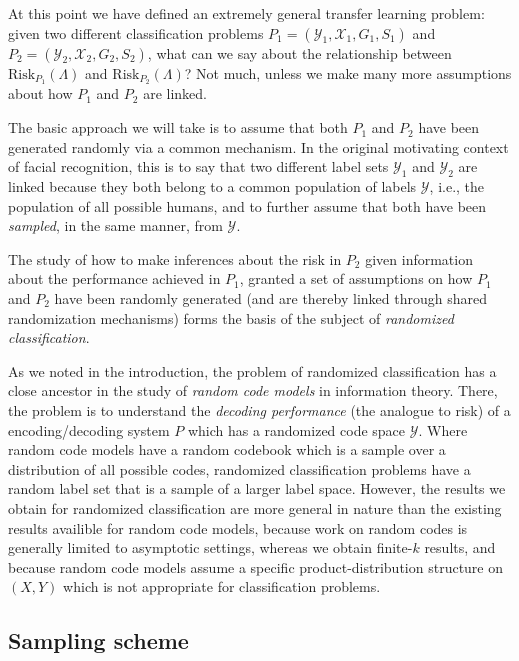 At this point we have defined an extremely general transfer learning
problem: given two different classification problems $P_1 =
(\mathcal{Y}_1, \mathcal{X}_1, G_1, S_1)$ and $P_2 = (\mathcal{Y}_2,
\mathcal{X}_2, G_2, S_2)$, what can we say about the relationship
between $\text{Risk}_{P_1}(\Lambda)$ and $\text{Risk}_{P_2}(\Lambda)$?
Not much, unless we make many more assumptions about how $P_1$ and
$P_2$ are linked.  

The basic approach we will take is to assume that both $P_1$ and $P_2$
have been generated randomly via a common mechanism.  In the original
motivating context of facial recognition, this is to say that two
different label sets $\mathcal{Y}_1$ and $\mathcal{Y}_2$ are linked
because they both belong to a common population of labels
$\mathcal{Y}$, i.e., the population of all possible humans, and to
further assume that both have been \emph{sampled}, in the same manner,
from $\mathcal{Y}$.

The study of how to make inferences about the risk in $P_2$ given
information about the performance achieved in $P_1$, granted a set of
assumptions on how $P_1$ and $P_2$ have been randomly generated (and
are thereby linked through shared randomization mechanisms) forms the
basis of the subject of \emph{randomized classification}.

As we noted in the introduction, the problem of randomized
classification has a close ancestor in the study of \emph{random code
  models} in information theory.  There, the problem is to understand
the \emph{decoding performance} (the analogue to risk) of a
encoding/decoding system $P$ which has a randomized code space
$\mathcal{Y}$.  Where random code models have a random codebook which
is a sample over a distribution of all possible codes, randomized
classification problems have a random label set that is a sample of a
larger label space.  However, the results we obtain for randomized
classification are more general in nature than the existing results
availible for random code models, because work on random codes is
generally limited to asymptotic settings, whereas we obtain finite-$k$
results, and because random code models assume a specific
product-distribution structure on $(X, Y)$ which is not appropriate
for classification problems.

\subsection{Sampling scheme}


